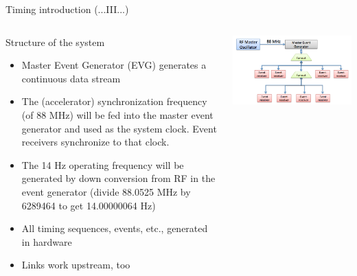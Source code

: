 \documentclass[
  9pt
  , table
  , ignorenonframetext
]{beamer}
\begin{document}
\begin{frame}{Timing introduction (...III...)}
  \begin{columns}
    \begin{column}{.6\textwidth}
      \begin{block}{Structure of the system}
        \begin{itemize}
          \item Master Event Generator (EVG) generates a continuous data stream
          \item The (accelerator) synchronization frequency (of 88 MHz) will be fed into the master event generator and used as the system clock. Event receivers synchronize to that clock.
          \item The 14 Hz operating frequency will be generated by down conversion from RF in the event generator (divide 88.0525 MHz by 6289464 to get 14.00000064 Hz)
          \item All timing sequences, events, etc., generated in hardware
          \item Links work upstream, too
        \end{itemize}
      \end{block}
    \end{column}
    \begin{column}{.5\textwidth}
      \centering
      \includegraphics[width=1\textwidth]{./pictures/TimingDistribution.png}
    \end{column}
  \end{columns}
\end{frame}
\end{document}
